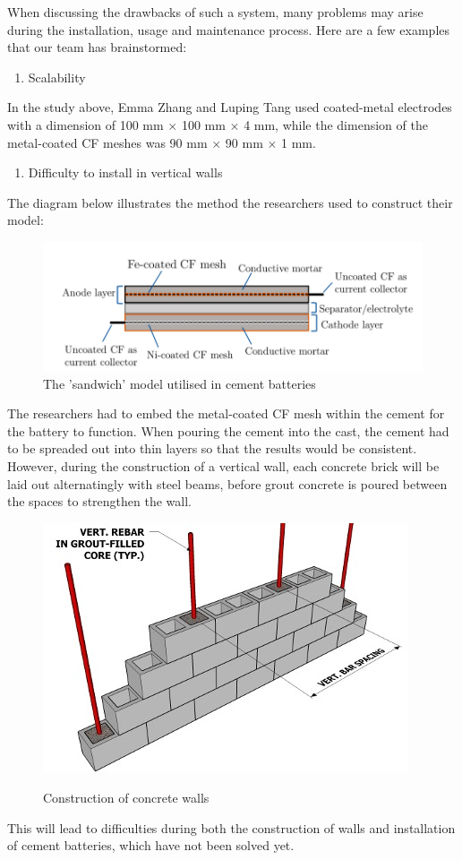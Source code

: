 When discussing the drawbacks of such a system, many problems may arise during the installation, usage and maintenance process. Here are a few examples that our team has brainstormed:
\begin{enumerate}
    \item Scalability
\end{enumerate}
In the study above, Emma Zhang and Luping Tang used coated-metal electrodes with a dimension of 100 mm $\times$ 100 mm $\times$ 4 mm, while the dimension of the metal-coated CF meshes was 90 mm $\times$ 90 mm $\times$ 1 mm. 

\begin{enumerate}[resume]
    \item Difficulty to install in vertical walls
\end{enumerate}
The diagram below illustrates the method the researchers used to construct their model:
\begin{figure}[H]
\centering
\includegraphics[scale=0.75]{A}
\caption{The 'sandwich' model utilised in cement batteries}
\label{fig:bat}
\end{figure}
The researchers had to embed the metal-coated CF mesh within the cement for the battery to function. When pouring the cement into the cast, the cement had to be spreaded out into thin layers so that the results would be consistent. However, during the construction of a vertical wall, each concrete brick will be laid out alternatingly with steel beams, before grout concrete is poured between the spaces to strengthen the wall.
\begin{figure}[H]
\centering
\includegraphics[scale=0.75]{B}
\caption{Construction of concrete walls}\cite{theconstructor:walls}
\end{figure}
This will lead to difficulties during both the construction of walls and installation of cement batteries, which have not been solved yet.

